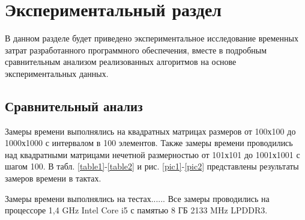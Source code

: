 \documentclass[12pt, a4paper]{report}
\begin{document}
			
	\chapter{Экспериментальный раздел}
	
	\vspace{-0.6cm}\hspace{0.5cm}В данном разделе будет приведено экспериментальное исследование временных затрат разработанного программного обеспечения, вместе в подробным сравнительным анализом реализованных алгоритмов на основе экспериментальных данных.
	
	\section{Сравнительный анализ}
	
	\hspace{0.6cm}Замеры времени выполнялись на квадратных матрицах размеров от 100х100 до 1000х1000 с интервалом в 100 элементов. Также замеры времени проводились над квадратными матрицами нечетной размерностью  от 101х101 до 1001х1001 с шагом 100. В табл. \ref{table1}-\ref{table2} и рис. \ref{pic1}-\ref{pic2} представлены результаты замеров времени в тактах.
	
	\vspace{0.3cm}Замеры времени выполнялись на тестах...... Все замеры проводились на процессоре 1,4 GHz Intel Core i5 с памятью 8 ГБ 2133 MHz LPDDR3.
	
\end{document}

